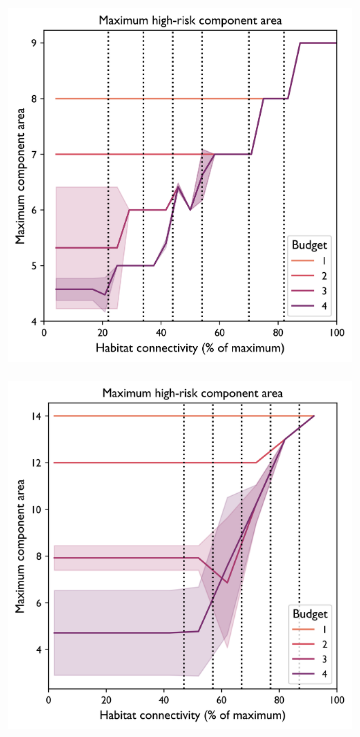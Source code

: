 \begin{figure}[H]
\begin{subfigure}[b]{0.4\textwidth}
         \caption{}
         \label{fig:indicator_component4}
     \end{subfigure}
     \hfill
          \begin{subfigure}[b]{0.4\textwidth}
         \centering
         \includegraphics[width=.98\textwidth]{figures/wildland/max_component_area3.png}
         \caption{}
         \label{fig:indicator_component3}
     \end{subfigure}
     \begin{subfigure}[b]{0.4\textwidth}
         \centering
         \includegraphics[width=\textwidth]{figures/wildland/max_component_area4.png}

\end{subfigure}
\end{figure}
